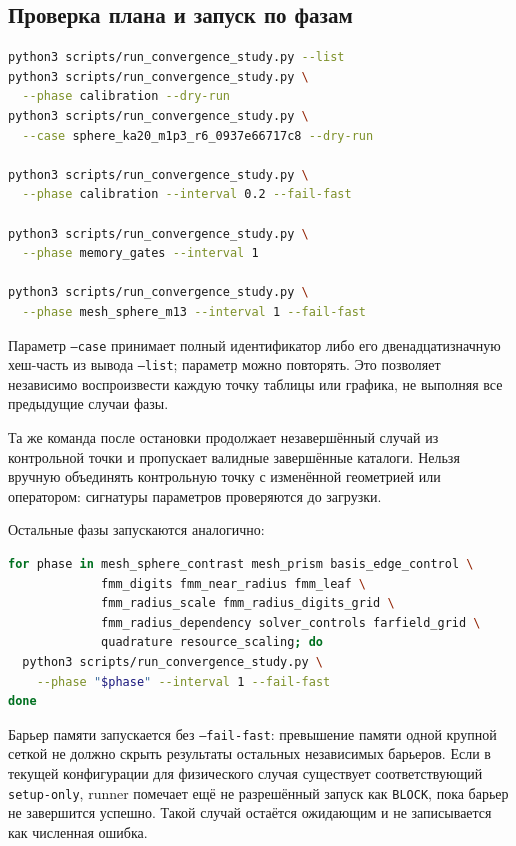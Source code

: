 \documentclass[12pt,a4paper]{article}
\begin{document}
\subsection{Проверка плана и запуск по фазам}

\begin{lstlisting}[language=bash]
python3 scripts/run_convergence_study.py --list
python3 scripts/run_convergence_study.py \
  --phase calibration --dry-run
python3 scripts/run_convergence_study.py \
  --case sphere_ka20_m1p3_r6_0937e66717c8 --dry-run

python3 scripts/run_convergence_study.py \
  --phase calibration --interval 0.2 --fail-fast

python3 scripts/run_convergence_study.py \
  --phase memory_gates --interval 1

python3 scripts/run_convergence_study.py \
  --phase mesh_sphere_m13 --interval 1 --fail-fast
\end{lstlisting}

Параметр \texttt{--case} принимает полный идентификатор либо его
двенадцатизначную хеш-часть из вывода \texttt{--list}; параметр можно
повторять. Это позволяет независимо воспроизвести каждую точку таблицы или
графика, не выполняя все предыдущие случаи фазы.

Та же команда после остановки продолжает незавершённый случай из контрольной
точки и пропускает валидные завершённые каталоги. Нельзя вручную объединять
контрольную точку с изменённой геометрией или оператором: сигнатуры параметров
проверяются до загрузки.

Остальные фазы запускаются аналогично:
\begin{lstlisting}[language=bash]
for phase in mesh_sphere_contrast mesh_prism basis_edge_control \
             fmm_digits fmm_near_radius fmm_leaf \
             fmm_radius_scale fmm_radius_digits_grid \
             fmm_radius_dependency solver_controls farfield_grid \
             quadrature resource_scaling; do
  python3 scripts/run_convergence_study.py \
    --phase "$phase" --interval 1 --fail-fast
done
\end{lstlisting}

Барьер памяти запускается без \texttt{--fail-fast}: превышение памяти одной
крупной сеткой не должно скрыть результаты остальных независимых барьеров.
Если в текущей конфигурации для физического случая существует соответствующий
\texttt{setup-only}, runner помечает ещё не разрешённый запуск как
\texttt{BLOCK}, пока барьер не завершится успешно. Такой случай остаётся
ожидающим и не записывается как численная ошибка.
\end{document}
